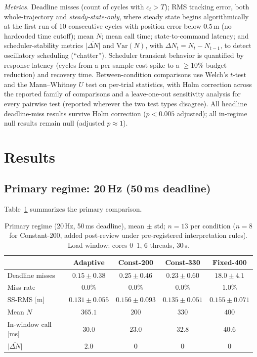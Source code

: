 \documentclass[conference]{IEEEtran}
\begin{document}
\emph{Metrics.} Deadline misses (count of cycles with $c_t > T$); RMS
tracking error, both whole-trajectory and \emph{steady-state-only},
where steady state begins algorithmically at the first run of 10
consecutive cycles with position error below 0.5\,m (no hardcoded time
cutoff); mean $N$; mean call time; state-to-command latency; and
scheduler-stability metrics $\overline{|\Delta N|}$ and
$\mathrm{Var}(N)$, with $\Delta N_t = N_t - N_{t-1}$, to detect
oscillatory scheduling (``chatter''). Scheduler transient behavior is
quantified by response latency (cycles from a per-sample cost spike to a
$\geq$10\% budget reduction) and recovery time. Between-condition
comparisons use Welch's $t$-test and the Mann--Whitney $U$ test on
per-trial statistics, with Holm correction across the reported family of
comparisons and a leave-one-out sensitivity analysis for every pairwise
test (reported wherever the two test types disagree). All headline
deadline-miss results survive Holm correction ($p < 0.005$ adjusted);
all in-regime null results remain null (adjusted $p \approx 1$).

\section{Results}
\label{sec:results}

\subsection{Primary regime: 20\,Hz (50\,ms deadline)}
\label{sec:results:20hz}

Table~\ref{tab:20hz} summarizes the primary comparison.

\begin{table}[t]
\caption{Primary regime (20\,Hz, 50\,ms deadline), mean $\pm$ std;
$n{=}13$ per condition ($n{=}8$ for Constant-200, added post-review
under pre-registered interpretation rules). Load window: cores 0--1, 6
threads, 30\,s.}
\label{tab:20hz}
\centering
\begin{tabular}{lcccc}
\toprule
 & Adaptive & Const-200 & Const-330 & Fixed-400 \\
\midrule
Deadline misses      & $0.15 \pm 0.38$  & $0.25 \pm 0.46$ & $0.23 \pm 0.60$  & $18.0 \pm 4.1$ \\
Miss rate            & $0.0\%$          & $0.0\%$         & $0.0\%$          & $1.0\%$ \\
SS-RMS [m]           & $0.131 \pm 0.055$& $0.156 \pm 0.093$ & $0.135 \pm 0.051$& $0.155 \pm 0.071$ \\
Mean $N$             & $365.1$          & $200$           & $330$            & $400$ \\
In-window call [ms]  & $30.0$           & $23.0$          & $32.8$           & $40.6$ \\
$\overline{|\Delta N|}$ & $2.0$         & $0$             & $0$              & $0$ \\
\bottomrule
\end{tabular}
\end{table}
\end{document}
